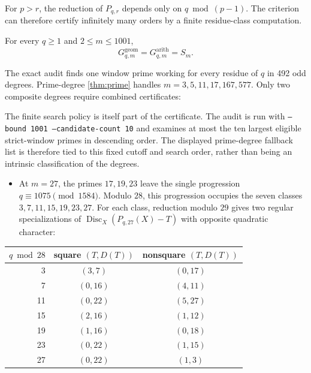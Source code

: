 For $p>r$, the reduction of $P_{q,r}$ depends only on $q\bmod(p-1)$. The
criterion can therefore certify infinitely many orders by a finite
residue-class computation.

\begin{theorem}\label{thm:1001}
For every $q\ge1$ and $2\le m\le1001$,
\begin{equation}
\boxed{G^{\mathrm{geom}}_{q,m}=G^{\mathrm{arith}}_{q,m}=S_m.}
\label{eq:1001}
\end{equation}
\end{theorem}

The exact audit finds one window prime working for every residue of $q$ in
492 odd degrees. Prime-degree \cref{thm:prime} handles
$m=3,5,11,17,167,577$. Only two composite degrees require combined
certificates:

The finite search policy is itself part of the certificate.  The audit is
run with \texttt{--bound 1001 --candidate-count 10} and examines at most the
ten largest eligible strict-window primes in descending order.  The displayed
prime-degree fallback list is therefore tied to this fixed cutoff and search
order, rather than being an intrinsic classification of the degrees.
\begin{itemize}
\item At $m=27$, the primes $17,19,23$ leave the single progression
$q\equiv1075\pmod{1584}$. Modulo $28$, this progression occupies the seven
classes $3,7,11,15,19,23,27$. For each class, reduction modulo $29$ gives
two regular specializations of
$\operatorname{Disc}_X(P_{q,27}(X)-T)$ with opposite quadratic character:
\end{itemize}

\begin{center}
\small
\begin{tabular}{@{}rcc@{}}
\toprule
$q\bmod 28$ & square $(T,D(T))$ & nonsquare $(T,D(T))$\\
\midrule
3  & $(3,7)$  & $(0,17)$\\
7  & $(0,16)$ & $(4,11)$\\
11 & $(0,22)$ & $(5,27)$\\
15 & $(2,16)$ & $(1,12)$\\
19 & $(1,16)$ & $(0,18)$\\
23 & $(0,22)$ & $(1,15)$\\
27 & $(0,22)$ & $(1,3)$\\
\bottomrule
\end{tabular}
\end{center}

